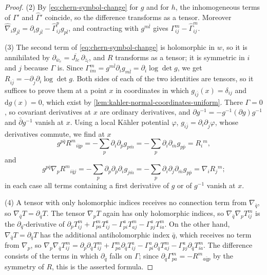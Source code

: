 \begin{proof}
(2) By \eqref{eq:chern-symbol-change} for $g$ and for $h$, the inhomogeneous terms of $\Gamma'$ and $\widehat\Gamma'$ coincide, so the difference transforms as a tensor. Moreover $\widehat\nabla_ig_{j\bar l}=\partial_ig_{j\bar l}-\widehat\Gamma^p_{ij}g_{p\bar l}$, and contracting with $g^{m\bar l}$ gives $\Gamma^m_{ij}-\widehat\Gamma^m_{ij}$.

(3) The second term of \eqref{eq:chern-symbol-change} is holomorphic in $w$, so it is annihilated by $\partial_{\bar w_e}=\overline{J_{le}}\,\partial_{\bar z_l}$, and $R$ transforms as a tensor; it is symmetric in $i$ and $j$ because $\Gamma$ is. Since $\Gamma^m_{im}=g^{m\bar l}\partial_ig_{m\bar l}=\partial_i\log\det g$, we get $R_{i\bar j}=-\partial_{\bar j}\partial_i\log\det g$. Both sides of each of the two identities are tensors, so it suffices to prove them at a point $x$ in coordinates in which $g_{i\bar j}(x)=\delta_{ij}$ and $\mathrm dg(x)=0$, which exist by \cref{lem:kahler-normal-coordinates-uniform}. There $\Gamma=0$, so covariant derivatives at $x$ are ordinary derivatives, and $\partial g^{-1}=-g^{-1}(\partial g)g^{-1}$ and $\bar\partial g^{-1}$ vanish at $x$. Using a local K\"ahler potential $\varphi$, $g_{i\bar j}=\partial_i\partial_{\bar j}\varphi$, whose derivatives commute, we find at $x$
\[
 g^{p\bar q}R^m{}_{i\bar qp}=-\sum_p\partial_i\partial_{\bar p}g_{p\bar m}=-\sum_p\partial_i\partial_{\bar m}g_{p\bar p}=R_i{}^m,
\]
and
\[
 g^{p\bar q}\nabla_pR^m{}_{i\bar qj}=-\sum_p\partial_p\partial_{\bar p}\partial_ig_{j\bar m}
 =-\sum_p\partial_i\partial_j\partial_{\bar m}g_{p\bar p}=\nabla_iR_j{}^m;
\]
in each case all terms containing a first derivative of $g$ or of $g^{-1}$ vanish at $x$.

(4) A tensor with only holomorphic indices receives no connection term from $\nabla_{\bar q}$, so $\nabla_{\bar q}T=\partial_{\bar q}T$. The tensor $\nabla_pT$ again has only holomorphic indices, so $\nabla_{\bar q}\nabla_pT^m_{ij}$ is the $\partial_{\bar q}$-derivative of $\partial_pT^m_{ij}+\Gamma^m_{pa}T^a_{ij}-\Gamma^a_{pi}T^m_{aj}-\Gamma^a_{pj}T^m_{ia}$. On the other hand, $\nabla_{\bar q}T=\partial_{\bar q}T$ has the additional antiholomorphic index $\bar q$, which receives no term from $\nabla_p$, so $\nabla_p\nabla_{\bar q}T^m_{ij}=\partial_p\partial_{\bar q}T^m_{ij}+\Gamma^m_{pa}\partial_{\bar q}T^a_{ij}-\Gamma^a_{pi}\partial_{\bar q}T^m_{aj}-\Gamma^a_{pj}\partial_{\bar q}T^m_{ia}$. The difference consists of the terms in which $\partial_{\bar q}$ falls on $\Gamma$; since $\partial_{\bar q}\Gamma^m_{pa}=-R^m{}_{a\bar qp}$ by the symmetry of $R$, this is the asserted formula.
\end{proof}


